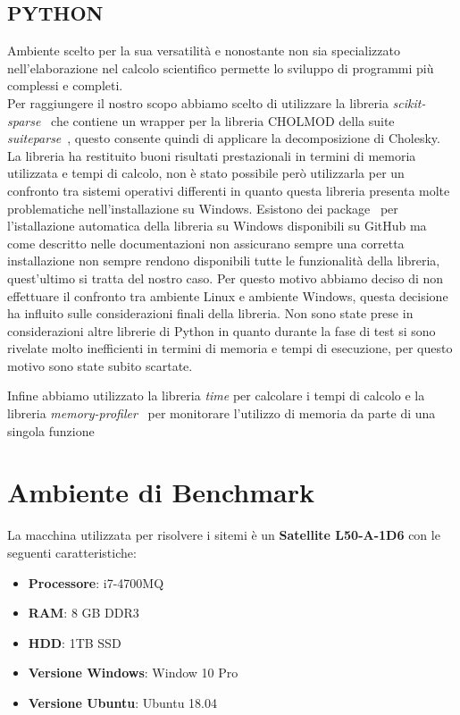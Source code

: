 \documentclass[a4paper,12pt,titlepage,oneside]{book}
\begin{document}
        \subsection{PYTHON}
        \noindent Ambiente scelto per la sua versatilità e nonostante non sia specializzato nell'elaborazione nel calcolo scientifico permette lo sviluppo di programmi più complessi e completi.\\
        Per raggiungere il nostro scopo abbiamo scelto di utilizzare la libreria \textit{scikit-sparse}~\cite{scikit-sparse} che contiene un wrapper per la libreria CHOLMOD della suite \textit{suiteparse}~\cite{suitesparse}, questo consente quindi di applicare la decomposizione di Cholesky.
        La libreria ha restituito buoni risultati prestazionali in termini di memoria utilizzata e tempi di calcolo, non è stato possibile però utilizzarla per un confronto tra sistemi operativi differenti in quanto questa libreria presenta molte problematiche nell'installazione su Windows. Esistono dei package~\cite{package} per l'istallazione automatica della libreria su Windows disponibili su GitHub ma come descritto nelle documentazioni non assicurano sempre una corretta installazione non sempre rendono disponibili tutte le funzionalità della libreria, quest'ultimo si tratta del nostro caso.
        Per questo motivo abbiamo deciso di non effettuare il confronto tra ambiente Linux e ambiente Windows, questa decisione ha influito sulle considerazioni finali della libreria. Non sono state prese in considerazioni altre librerie di Python in quanto durante la fase di test si sono rivelate molto inefficienti in termini di memoria e tempi di esecuzione, per questo motivo sono state subito scartate.\\[0.5cm]
        
        
        
        \vspace{0.5cm}
        
        \noindent Infine abbiamo utilizzato la libreria \textit{time} per calcolare i tempi di calcolo e la libreria \textit{memory-profiler}~\cite{profilerpython} per monitorare l'utilizzo di memoria da parte di una singola funzione
    
    \newpage
    \section{Ambiente di Benchmark}
    La macchina utilizzata per risolvere i sitemi è un \textbf{Satellite L50-A-1D6} con le seguenti caratteristiche:
    \begin{itemize}
      \item \textbf{Processore}: i7-4700MQ
      \item \textbf{RAM}: 8 GB DDR3
      \item \textbf{HDD}: 1TB SSD
      \item \textbf{Versione Windows}: Window 10 Pro
      \item \textbf{Versione Ubuntu}: Ubuntu 18.04
    \end{itemize}
    
\end{document}
